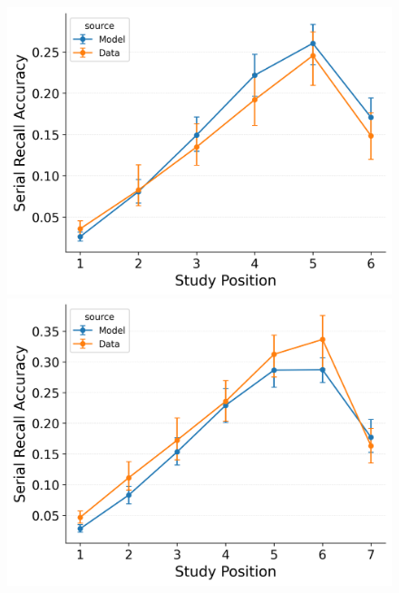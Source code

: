 \documentclass[
  man,
  floatsintext,
  longtable,
  nolmodern,
  notxfonts,
  notimes,
  draftfirst,
  colorlinks=true,linkcolor=blue,citecolor=blue,urlcolor=blue]{apa7}
\begin{document}
\begin{figure}
\begin{minipage}{0.33\linewidth}
\includegraphics{figures/Gordon2021_CRU_with_Pre-Expt_and_Primacy__and_ContextTerm_Confusable_Fitting_order_error_rate_LL6.png}\end{minipage}%
%
\begin{minipage}{0.33\linewidth}
\includegraphics{figures/Gordon2021_CRU_with_Pre-Expt_and_Primacy__and_ContextTerm_Confusable_Fitting_order_error_rate_LL7.png}\end{minipage}%
\newline
\begin{minipage}{0.33\linewidth}

\end{minipage}
\end{figure}
\end{document}
